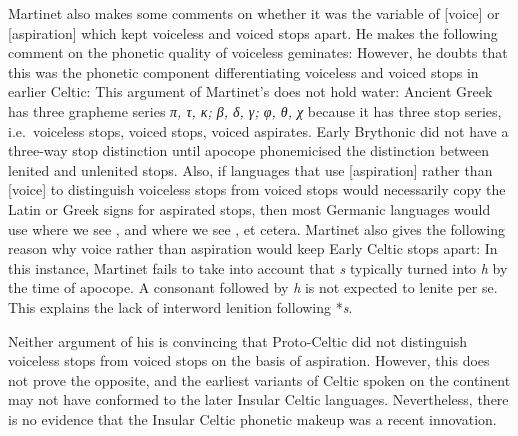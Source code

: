 Martinet also makes some comments on whether it was the variable of [voice] or [aspiration] which kept voiceless and voiced stops apart. He makes the following comment on the phonetic quality of voiceless geminates:
However, he doubts that this was the phonetic component differentiating voiceless and voiced stops in earlier Celtic:
This argument of Martinet's does not hold water: Ancient Greek has three grapheme series \textit{π, τ, κ;  β, δ, γ; φ, θ, χ} because it has three stop series, i.e.\ voiceless stops, voiced stops, voiced aspirates. Early Brythonic did not have a three-way stop distinction until apocope phonemicised the distinction between lenited and unlenited stops. Also, if languages that use [aspiration] rather than [voice] to distinguish voiceless stops from voiced stops would necessarily copy the Latin or Greek signs for aspirated stops, then most Germanic languages would use  where we see , and  where we see , et cetera.
Martinet also gives the following reason why voice rather than aspiration would keep Early Celtic stops apart:
In this instance, Martinet fails to take into account that \textit{s} typically turned into \textit{h} by the time of apocope. A consonant followed by \textit{h} is not expected to lenite per se. This explains the lack of interword lenition following *\textit{s}.

Neither argument of his is convincing that Proto-Celtic did not distinguish voiceless stops from voiced stops on the basis of aspiration. However, this does not prove the opposite, and  the earliest variants of Celtic spoken on the continent may not have conformed to the later Insular Celtic languages. Nevertheless, there is no evidence that the Insular Celtic phonetic makeup was a recent innovation.

